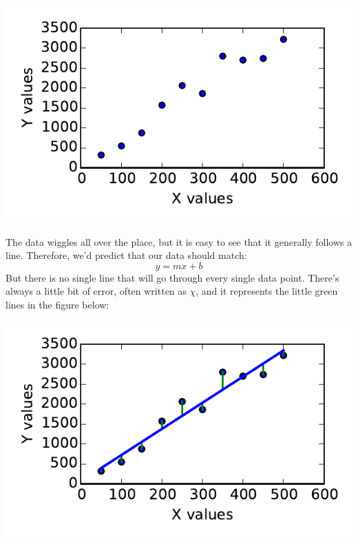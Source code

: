 \documentclass[twoside,11pt,ShortChapTitles]{BYUTextbook}
\begin{document}
\begin{center}
\includegraphics{Lab4_figs/dataScatter.pdf}
\end{center}

The data wiggles all over the place, but it is easy to see that it generally follows a line.  Therefore, we'd predict that our data should match:
\[y=mx+b\]
But there is no single line that will go through every single data point.  There's always a little bit of error, often written as $\chi$, and it represents the little green lines in the figure below:
\begin{center}
\includegraphics{Lab4_figs/dataWfit.pdf}
\end{center}
\end{document}
